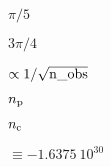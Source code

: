 \documentclass[12pt,twoside]{article}
\providecommand{\facname}{}%
\providecommand{\FACNAME}{}%
\def\lthtmlcheckvsize{\ifdim\ht\sizebox<\vsize 
  \ifdim\wd\sizebox<\hsize\expandafter\hfill\fi \expandafter\vfill
  \else\expandafter\vss\fi}%
\begin{document}
\renewcommand{\facname}{{query\_strip }}

\renewcommand{\FACNAME}{{QUERY\_STRIP }}
{\newpage\clearpage
{}%
$\pi/5$%
\lthtmlindisplaymathZ
\lthtmlcheckvsize\clearpage}

{\newpage\clearpage
{}%
$3\pi/4$%
\lthtmlindisplaymathZ
\lthtmlcheckvsize\clearpage}


\renewcommand{\facname}{{query\_triangle }}

\renewcommand{\FACNAME}{{QUERY\_TRIANGLE }}

\renewcommand{\facname}{{read\_fits\_cut4 }}

\renewcommand{\FACNAME}{{READ\_FITS\_CUT4 }}
{\newpage\clearpage
{}%
$\propto 1/\sqrt{{\rm n\_obs}}$%
\lthtmlindisplaymathZ
\lthtmlcheckvsize\clearpage}


\renewcommand{\facname}{{read\_fits\_map }}

\renewcommand{\FACNAME}{{READ\_FITS\_MAP }}

\renewcommand{\facname}{{read\_fits\_partial}}

\renewcommand{\FACNAME}{{READ\_FITS\_PARTIAL}}
{\newpage\clearpage
{}%
$n_{\rm p}$%
\lthtmlindisplaymathZ
\lthtmlcheckvsize\clearpage}

{\newpage\clearpage
{}%
$n_{\rm c}$%
\lthtmlindisplaymathZ
\lthtmlcheckvsize\clearpage}


\renewcommand{\facname}{{read\_fits\_s }}

\renewcommand{\FACNAME}{{READ\_FITS\_S }}

\renewcommand{\facname}{{read\_tqu }}

\renewcommand{\FACNAME}{{READ\_TQU }}

\renewcommand{\facname}{{remove\_dipole}}

\renewcommand{\FACNAME}{{REMOVE\_DIPOLE}}
{\newpage\clearpage
{}%
$\equiv -1.6375\ 10^{30}$%
\lthtmlindisplaymathZ
\lthtmlcheckvsize\clearpage}


\renewcommand{\facname}{{reorder }}
\end{document}

